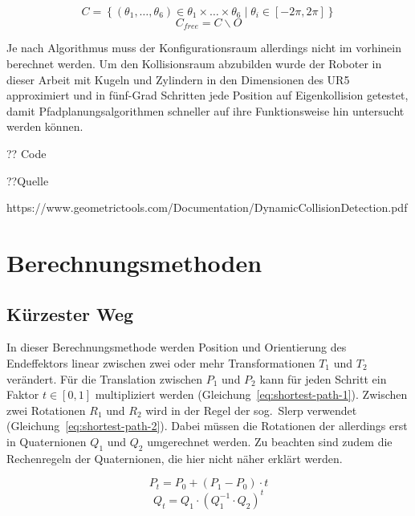 \begin{equation}
    \mathit{C} = \left\{ \left( \theta_1,\dots,\theta_6 \right) \in \theta_1\times\dots\times\theta_6 \mid \theta_i \in \left[ -2\pi, 2\pi \right]\right\}
    \label{eq:config-1}
\end{equation}
\begin{equation}
    \mathit{C}_{free} = \mathit{C}\backslash\mathit{O}
    \label{eq:config-2}
\end{equation}

Je nach Algorithmus muss der Konfigurationsraum allerdings nicht im vorhinein berechnet werden.
Um den Kollisionsraum abzubilden wurde der Roboter in dieser Arbeit mit Kugeln und Zylindern in den Dimensionen des UR5 approximiert und in fünf-Grad Schritten jede Position auf Eigenkollision getestet, damit Pfadplanungsalgorithmen schneller auf ihre Funktionsweise hin untersucht werden können.

?? Code

??Quelle

https://www.geometrictools.com/Documentation/DynamicCollisionDetection.pdf


\section{Berechnungsmethoden}

\subsection{Kürzester Weg}\label{subsec:kurzester-weg}

In dieser Berechnungsmethode werden Position und Orientierung des Endeffektors linear zwischen zwei oder mehr Transformationen $T_1$ und $T_2$ verändert.
Für die Translation zwischen $P_1$ und $P_2$ kann für jeden Schritt ein Faktor $t \in \left[0,1\right]$ multipliziert werden (Gleichung~\ref{eq:shortest-path-1}).
Zwischen zwei Rotationen $R_1$ und $R_2$ wird in der Regel der sog.\ Slerp verwendet (Gleichung~\ref{eq:shortest-path-2}).
Dabei müssen die Rotationen der allerdings erst in Quaternionen $Q_1$ und $Q_2$ umgerechnet werden.
Zu beachten sind zudem die Rechenregeln der Quaternionen, die hier nicht näher erklärt werden.

\begin{equation}
    P_{t} = P_0 + \left( P_1 - P_0 \right) \cdot t
    \label{eq:shortest-path-1}
\end{equation}
\begin{equation}
    Q_{t} = Q_1 \cdot \left( Q_1^{-1} \cdot Q_2 \right)^t
    \label{eq:shortest-path-2}
\end{equation}

